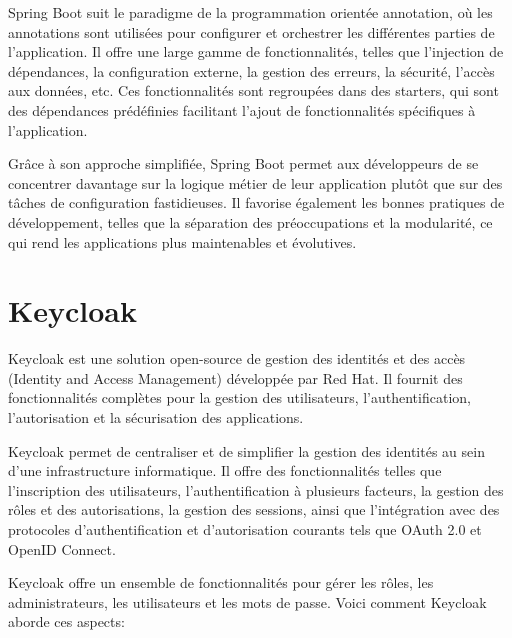 Spring Boot suit le paradigme de la programmation orientée annotation, où les annotations sont utilisées pour configurer et orchestrer les différentes parties de l'application. Il offre une large gamme de fonctionnalités, telles que l'injection de dépendances, la configuration externe, la gestion des erreurs, la sécurité, l'accès aux données, etc. Ces fonctionnalités sont regroupées dans des starters, qui sont des dépendances prédéfinies facilitant l'ajout de fonctionnalités spécifiques à l'application.

Grâce à son approche simplifiée, Spring Boot permet aux développeurs de se concentrer davantage sur la logique métier de leur application plutôt que sur des tâches de configuration fastidieuses. Il favorise également les bonnes pratiques de développement, telles que la séparation des préoccupations et la modularité, ce qui rend les applications plus maintenables et évolutives.


\section{Keycloak}

Keycloak est une solution open-source de gestion des identités et des accès (Identity and Access Management) développée par Red Hat. Il fournit des fonctionnalités complètes pour la gestion des utilisateurs, l'authentification, l'autorisation et la sécurisation des applications.

Keycloak permet de centraliser et de simplifier la gestion des identités au sein d'une infrastructure informatique. Il offre des fonctionnalités telles que l'inscription des utilisateurs, l'authentification à plusieurs facteurs, la gestion des rôles et des autorisations, la gestion des sessions, ainsi que l'intégration avec des protocoles d'authentification et d'autorisation courants tels que OAuth 2.0 et OpenID Connect.

Keycloak offre un ensemble de fonctionnalités pour gérer les rôles, les administrateurs, les utilisateurs et les mots de passe. Voici comment Keycloak aborde ces aspects:

